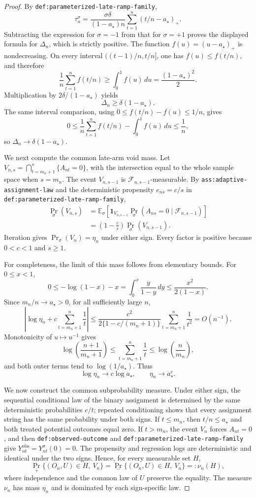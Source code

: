 \documentclass{article}
\begin{document}
\begin{proof}
By \texttt{def:parameterized-late-ramp-family},
\[
 \tau_n^\sigma
 =\frac{\sigma\delta}{(1-a_\star)n}
   \sum_{t=1}^{n}(t/n-a_\star)_+.
\]
Subtracting the expression for \(\sigma=-1\) from that for \(\sigma=+1\) proves the displayed formula for \(\Delta_n\), which is strictly positive. The function \(f(u)=(u-a_\star)_+\) is nondecreasing. On every interval \(((t-1)/n,t/n]\), one has \(f(u)\le f(t/n)\), and therefore
\[
 \frac1n\sum_{t=1}^{n}f(t/n)
 \ge \int_0^1 f(u)\,du
 =\frac{(1-a_\star)^2}{2}.
\]
Multiplication by \(2\delta/(1-a_\star)\) yields
\[
 \Delta_n\ge\delta(1-a_\star).
\]
The same interval comparison, using
\(0\le f(t/n)-f(u)\le 1/n\), gives
\[
 0\le \frac1n\sum_{t=1}^{n}f(t/n)-\int_0^1f(u)\,du\le\frac1n,
\]
so \(\Delta_n\to\delta(1-a_\star)\).

We next compute the common late-arm void mass. Let
\(V_{n,s}=\bigcap_{t=m_n+1}^{s}\{A_{nt}=0\}\), with the intersection equal to the whole sample space when \(s=m_n\). The event \(V_{n,s-1}\) is \(\mathcal F_{n,s-1}\)-measurable. By \texttt{ass:adaptive-assignment-law} and the deterministic propensity \(e_{ns}=c/s\) in \texttt{def:parameterized-late-ramp-family},
\[
 \begin{aligned}
 \Pr_\sigma(V_{n,s})
 &=\mathbb E_\sigma\!\left[
   \mathbf 1_{V_{n,s-1}}
   \Pr_\sigma(A_{ns}=0\mid\mathcal F_{n,s-1})
 \right]\\
 &=\left(1-\frac cs\right)\Pr_\sigma(V_{n,s-1}).
 \end{aligned}
\]
Iteration gives \(\Pr_\sigma(V_n)=\eta_n\) under either sign. Every factor is positive because \(0<c<1\) and \(s\ge1\).

For completeness, the limit of this mass follows from elementary bounds. For \(0\le x<1\),
\[
 0\le-\log(1-x)-x
 =\int_0^x\frac y{1-y}\,dy
 \le\frac{x^2}{2(1-x)}.
\]
Since \(m_n/n\to a_\star>0\), for all sufficiently large \(n\),
\[
 \left|\log\eta_n+c\sum_{t=m_n+1}^{n}\frac1t\right|
 \le
 \frac{c^2}{2\{1-c/(m_n+1)\}}
 \sum_{t=m_n+1}^{n}\frac1{t^2}
 =O(n^{-1}).
\]
Monotonicity of \(u\mapsto u^{-1}\) gives
\[
 \log\!\left(\frac{n+1}{m_n+1}\right)
 \le\sum_{t=m_n+1}^{n}\frac1t
 \le\log\!\left(\frac n{m_n}\right),
\]
and both outer terms tend to \(\log(1/a_\star)\). Thus
\[
 \log\eta_n\to c\log a_\star,
 \qquad \eta_n\to a_\star^c.
\]

We now construct the common subprobability measure. Under either sign, the sequential conditional law of the binary assignment is determined by the same deterministic probabilities \(c/t\); repeated conditioning shows that every assignment string has the same probability under both signs. If \(t\le m_n\), then \(t/n\le a_\star\) and both treated potential outcomes equal zero. If \(t>m_n\), the event \(V_n\) forces \(A_{nt}=0\), and then \texttt{def:observed-outcome} and \texttt{def:parameterized-late-ramp-family} give \(Y_{nt}^{\mathrm{obs}}=Y_{nt}^\sigma(0)=0\). The propensity and regression logs are deterministic and identical under the two signs. Hence, for every measurable set \(H\),
\[
 \Pr_+\{(O_n,U)\in H,\ V_n\}
 =\Pr_-\{(O_n,U)\in H,\ V_n\}
 =:\nu_n(H),
\]
where independence and the common law of \(U\) preserve the equality. The measure \(\nu_n\) has mass \(\eta_n\) and is dominated by each sign-specific law.


\end{proof}
\end{document}
